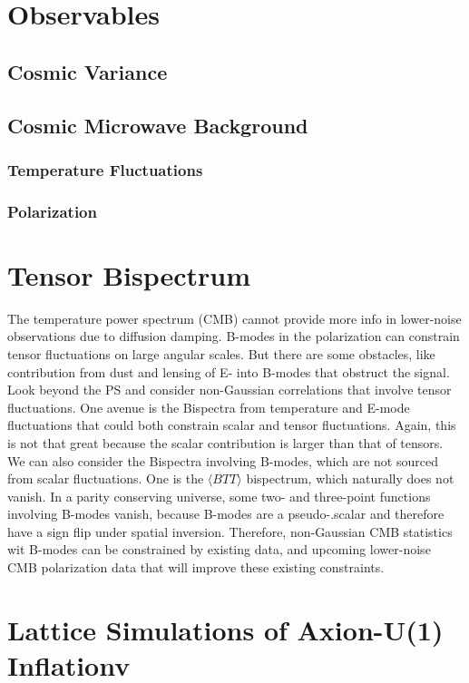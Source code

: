 \documentclass[12pt]{article}
\begin{document}
\section{Observables}
\subsection{Cosmic Variance}

\subsection{Cosmic Microwave Background}

\subsubsection{Temperature Fluctuations}
\subsubsection{Polarization}

\section{Tensor Bispectrum}
The temperature power spectrum (CMB) cannot provide more info in lower-noise observations due to diffusion damping. B-modes in the polarization can constrain tensor fluctuations on large angular scales. But there are some obstacles, like contribution from dust and lensing of E- into B-modes that obstruct the signal. Look beyond the PS and consider non-Gaussian correlations that involve tensor fluctuations. One avenue is the Bispectra from temperature and E-mode fluctuations that could both constrain scalar and tensor fluctuations. Again, this is not that great because the scalar contribution is larger than that of tensors. We can also consider the Bispectra involving B-modes, which are not sourced from scalar fluctuations. One is the $\langle BTT \rangle$ bispectrum, which naturally does not vanish. In a parity conserving universe, some two- and three-point functions involving B-modes vanish, because B-modes are a pseudo-.scalar and therefore have a sign flip under spatial inversion. Therefore, non-Gaussian CMB statistics wit B-modes can be constrained by existing data, and upcoming lower-noise CMB polarization data that will improve these existing constraints. 

\section{Lattice Simulations of Axion-U(1) Inflationv}
\end{document}

